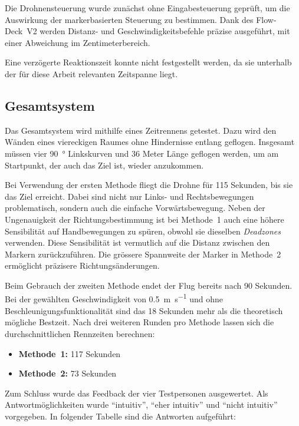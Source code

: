 Die Drohnensteuerung wurde zunächst ohne Eingabesteuerung geprüft, um die Auswirkung der markerbasierten Steuerung zu bestimmen.
Dank des Flow-Deck~V2 werden Distanz- und Geschwindigkeitsbefehle präzise ausgeführt, mit einer Abweichung im Zentimeterbereich.

Eine verzögerte Reaktionszeit konnte nicht festgestellt werden, da sie unterhalb der für diese Arbeit relevanten Zeitspanne liegt.

\subsection{Gesamtsystem}
\label{sec:whsy}

Das Gesamtsystem wird mithilfe eines Zeitrennens getestet.
Dazu wird den Wänden eines viereckigen Raumes ohne Hindernisse entlang geflogen.
Insgesamt müssen vier \SI{90}{\degree} Linkskurven und \si{36} Meter Länge geflogen werden, um am Startpunkt, der auch das Ziel ist, wieder anzukommen.

Bei Verwendung der ersten Methode fliegt die Drohne für \si{115} Sekunden, bis sie das Ziel erreicht.
Dabei sind nicht nur Links- und Rechtsbewegungen problematisch, sondern auch die einfache Vorwärtsbewegung.
Neben der Ungenauigkeit der Richtungsbestimmung ist bei Methode~1 auch eine höhere Sensibilität auf Handbewegungen zu spüren, obwohl sie dieselben \textit{Deadzones} verwenden.
Diese Sensibilität ist vermutlich auf die Distanz zwischen den Markern zurückzuführen.
Die grössere Spannweite der Marker in Methode~2 ermöglicht präzisere Richtungsänderungen.

Beim Gebrauch der zweiten Methode endet der Flug bereits nach \si{90} Sekunden. 
Bei der gewählten Geschwindigkeit von \SI{0.5}{\meter\per\second} und ohne Beschleunigungsfunktionalität sind das \si{18} Sekunden mehr als die theoretisch mögliche Bestzeit.\footnotemark{}
Nach drei weiteren Runden pro Methode lassen sich die durchschnittlichen Rennzeiten berechnen:

\begin{itemize}
    \item \textbf{Methode~1:} \si{117} Sekunden
    \item \textbf{Methode~2:} \si{73} Sekunden
\end{itemize}

Zum Schluss wurde das Feedback der vier Testpersonen ausgewertet.
Als Antwortmöglichkeiten wurde \enquote{intuitiv}, \enquote{eher intuitiv} und \enquote{nicht intuitiv} vorgegeben.
In folgender Tabelle sind die Antworten aufgeführt:

